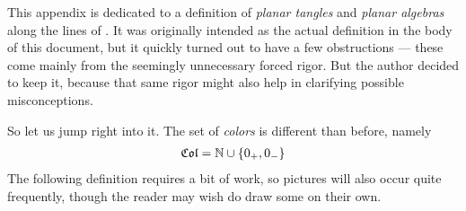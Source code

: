 This appendix is dedicated to a definition of \emph{planar tangles} and \emph{planar algebras} along the lines of \cite{KODIYALAM:OnPlanarAlgebras}. It was originally intended as the actual definition in the body of this document, but it quickly turned out to have a few obstructions --- these come mainly from the seemingly unnecessary forced rigor. But the author decided to keep it, because that same rigor might also help in clarifying possible misconceptions.

%

\bigno So let us jump right into it. The set of \emph{colors} is different than before, namely
\begin{align*}\index{Colors}
\mathfrak{Col}=\mathbb{N}\cup \left\{0_+,0_-\right\}
\end{align*}
The following definition requires a bit of work, so pictures will also occur quite frequently, though the reader may wish do draw some on their own.

